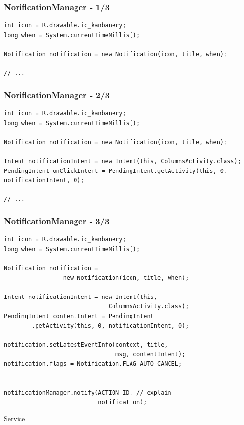 \documentclass{beamer}
\begin{document}
\begin{frame}[fragile]\frametitle{NorificationManager - 1/3}
\begin{lstlisting}
int icon = R.drawable.ic_kanbanery;
long when = System.currentTimeMillis();

Notification notification = new Notification(icon, title, when);

// ...
\end{lstlisting}
\end{frame}


\begin{frame}[fragile]\frametitle{NorificationManager - 2/3}
\begin{lstlisting}
int icon = R.drawable.ic_kanbanery;
long when = System.currentTimeMillis();

Notification notification = new Notification(icon, title, when);

Intent notificationIntent = new Intent(this, ColumnsActivity.class);
PendingIntent onClickIntent = PendingIntent.getActivity(this, 0, notificationIntent, 0);

// ...
\end{lstlisting}
\end{frame}

\begin{frame}[fragile]\frametitle{NotificationManager - 3/3}
\begin{lstlisting}
int icon = R.drawable.ic_kanbanery;
long when = System.currentTimeMillis();

Notification notification = 
                 new Notification(icon, title, when);

Intent notificationIntent = new Intent(this, 
                              ColumnsActivity.class);
PendingIntent contentIntent = PendingIntent
        .getActivity(this, 0, notificationIntent, 0);

notification.setLatestEventInfo(context, title, 
                                msg, contentIntent);
notification.flags = Notification.FLAG_AUTO_CANCEL;


notificationManager.notify(ACTION_ID, // explain 
                           notification);
\end{lstlisting}
\end{frame}


\begin{frame}
\begin{center}
 \Huge{Service}
\end{center}
\end{frame}
\end{document}
